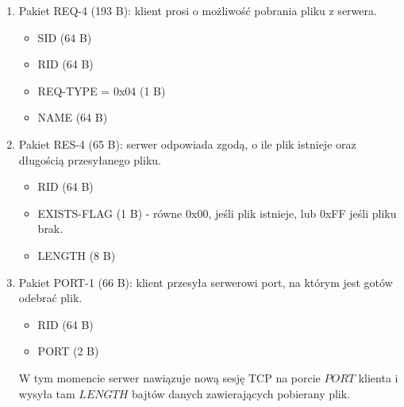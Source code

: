 \documentclass{article}
\begin{document}
	\begin{enumerate}
		\item Pakiet REQ-4 \label{REQ-4} (193 B): klient prosi o możliwość pobrania pliku z serwera. 
		\begin{itemize}
			\item SID (64 B)
			\item RID (64 B)
			\item REQ-TYPE = 0x04 (1 B)
			\item NAME (64 B)
		\end{itemize}
	
		\item Pakiet RES-4 \label{RES-4} (65 B): serwer odpowiada zgodą, o ile plik istnieje oraz długością przesyłanego pliku. 
		\begin{itemize}
			\item RID (64 B)
			\item EXISTS-FLAG (1 B) - równe 0x00, jeśli plik istnieje, lub 0xFF jeśli pliku brak. 
			\item LENGTH (8 B)
		\end{itemize}
	
		\item Pakiet PORT-1 \label{PORT-1} (66 B): klient przesyła serwerowi port, na którym jest gotów odebrać plik. 
		\begin{itemize}
			\item RID (64 B)
			\item PORT (2 B)
		\end{itemize}
	
		W tym momencie serwer nawiązuje nową sesję TCP na porcie $PORT$ klienta i wysyła tam $LENGTH$ bajtów danych zawierających pobierany plik. 
		
	\end{enumerate}
\end{document}
